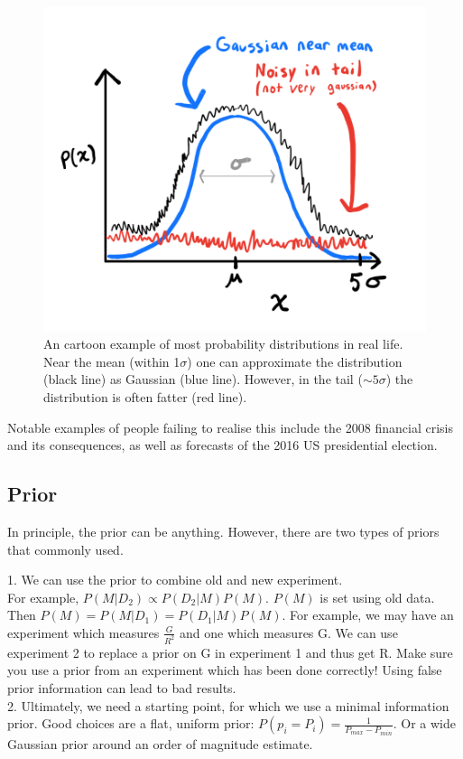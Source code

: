 \documentclass[12pt]{article}
\begin{document}
\begin{figure}[ht]
\includegraphics[scale=0.75]{gaussian_noise_plot.png}
\centering
\caption{An cartoon example of most probability distributions in real life. Near the mean (within 1$\sigma$) one can approximate the distribution (black line) as Gaussian (blue line). However, in the tail ($\sim 5\sigma$) the distribution is often fatter (red line).} \label{fig:gaussian_noise_plot}
\end{figure}

Notable examples of people failing to realise this include the 2008 financial crisis and its consequences, as well as forecasts of the 2016 US presidential election.

\subsection{Prior}

In principle, the prior can be anything. However, there are two types of priors that commonly used.

1. We can use the prior to combine old and new experiment.\\
For example, $P(M|D_2) \propto P(D_2|M)P(M)$. $P(M)$ is set using old data. Then $P(M) = P(M|D_1) = P(D_1|M)P(M)$.
For example, we may have an experiment which measures $\frac{G}{R^2}$ and one which measures G. We can use experiment 2 to replace a prior on G in experiment 1 and thus get R. Make sure you use a prior from an experiment which has been done correctly! Using false prior information can lead to bad results.\\
2. Ultimately, we need a starting point, for which we use a minimal information prior. Good choices are a flat, uniform prior: $P(p_i = P_i) = \frac{1}{P_{max} - P_{min}}$. Or a wide Gaussian prior around an order of magnitude estimate.
\end{document}
